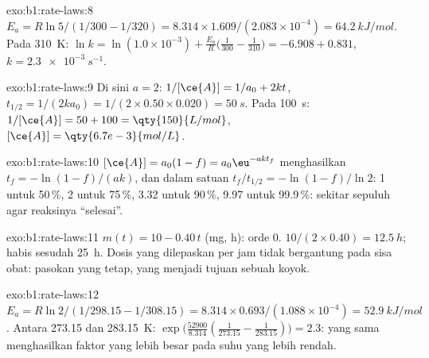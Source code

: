 \begin{solution}{exo:b1:rate-laws:8}
$E_a = R\ln5/(1/300 - 1/320) = 8.314 \times 1.609/(2.083 \times 10^{-4}) =
\qty{64.2}{kJ/mol}$. Pada \qty{310}{K}: $\ln k = \ln(1.0 \times 10^{-3}) +
\frac{E_a}{R}\big(\frac{1}{300} - \frac{1}{310}\big) = -6.908 + 0.831$,
$k = \qty{2.3e-3}{s^{-1}}$.
\end{solution}

\begin{solution}{exo:b1:rate-laws:9}
Di sini $a = 2$: $1/[\ce{A}] = 1/a_0 + 2kt$, $t_{1/2} = 1/(2k a_0) = 1/(2
\times 0.50 \times 0.020) = \qty{50}{s}$. Pada \qty{100}{s}: $1/[\ce{A}] = 50
+ 100 = \qty{150}{L/mol}$, $[\ce{A}] = \qty{6.7e-3}{mol/L}$.
\end{solution}

\begin{solution}{exo:b1:rate-laws:10}
$[\ce{A}] = a_0(1 - f) = a_0\eu^{-akt_f}$ menghasilkan $t_f = -\ln(1-f)/(ak)$,
dan dalam satuan  $t_f/t_{1/2} = -\ln(1-f)/\ln2$: 1 untuk
50\,\%, 2 untuk 75\,\%, 3.32 untuk 90\,\%, 9.97 untuk 99.9\,\%: sekitar
sepuluh  agar reaksinya ``selesai''.
\end{solution}

\begin{solution}{exo:b1:rate-laws:11}
$m(t) = 10 - 0.40\,t$ (\unit{mg}, \unit{h}): orde 0. 
$10/(2 \times 0.40) = \qty{12.5}{h}$; habis sesudah \qty{25}{h}. Dosis
yang dilepaskan per jam tidak bergantung pada sisa obat: pasokan yang
tetap, yang menjadi tujuan sebuah koyok.
\end{solution}

\begin{solution}{exo:b1:rate-laws:12}
$E_a = R\ln2/(1/298.15 - 1/308.15) = 8.314 \times 0.693/(1.088 \times
10^{-4}) = \qty{52.9}{kJ/mol}$. Antara 273.15 dan \qty{283.15}{K}:
$\exp\big(\frac{52900}{8.314}(\frac{1}{273.15} - \frac{1}{283.15})\big) =
2.3$:  yang sama menghasilkan faktor yang lebih besar pada
suhu yang lebih rendah.
\end{solution}

